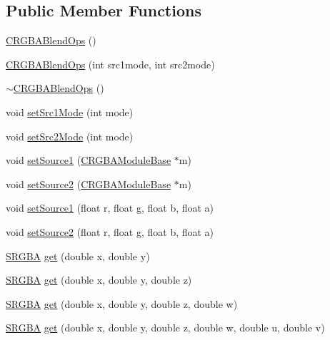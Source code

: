 \subsection*{Public Member Functions}
\begin{DoxyCompactItemize}
\item 
\hyperlink{classanl_1_1CRGBABlendOps_a19a2b880958c9eaf6fe9a4f2117eba30}{CRGBABlendOps} ()
\item 
\hyperlink{classanl_1_1CRGBABlendOps_a2c5ff29f71ba860ff9299a92052da9fb}{CRGBABlendOps} (int src1mode, int src2mode)
\item 
\hyperlink{classanl_1_1CRGBABlendOps_a037918456406da84cf0fd59450ba67c7}{$\sim$CRGBABlendOps} ()
\item 
void \hyperlink{classanl_1_1CRGBABlendOps_a8895c1e8daa979c1c730b6bd536cd67c}{setSrc1Mode} (int mode)
\item 
void \hyperlink{classanl_1_1CRGBABlendOps_a89a17d4851c1fd6cee4ea40f054214a2}{setSrc2Mode} (int mode)
\item 
void \hyperlink{classanl_1_1CRGBABlendOps_a2a5341db3a1d18430d50fc41673d07a9}{setSource1} (\hyperlink{classanl_1_1CRGBAModuleBase}{CRGBAModuleBase} $\ast$m)
\item 
void \hyperlink{classanl_1_1CRGBABlendOps_a299827480d3ad512957aa3613a8b188b}{setSource2} (\hyperlink{classanl_1_1CRGBAModuleBase}{CRGBAModuleBase} $\ast$m)
\item 
void \hyperlink{classanl_1_1CRGBABlendOps_a9fab3f2a1f371297e83d4dd5ff91c514}{setSource1} (float r, float g, float b, float a)
\item 
void \hyperlink{classanl_1_1CRGBABlendOps_aad67d910ce4b78aab12fbc5eab6bce9a}{setSource2} (float r, float g, float b, float a)
\item 
\hyperlink{structanl_1_1SRGBA}{SRGBA} \hyperlink{classanl_1_1CRGBABlendOps_aacba235e62c02f99459fed2e79992fe3}{get} (double x, double y)
\item 
\hyperlink{structanl_1_1SRGBA}{SRGBA} \hyperlink{classanl_1_1CRGBABlendOps_a4548f067089dfd648ca57471379377ec}{get} (double x, double y, double z)
\item 
\hyperlink{structanl_1_1SRGBA}{SRGBA} \hyperlink{classanl_1_1CRGBABlendOps_a892ffe25081bca07ee526fb77bdc0a09}{get} (double x, double y, double z, double w)
\item 
\hyperlink{structanl_1_1SRGBA}{SRGBA} \hyperlink{classanl_1_1CRGBABlendOps_a313f936098a144fcd1bf9acc8bd60ac6}{get} (double x, double y, double z, double w, double u, double v)
\end{DoxyCompactItemize}
